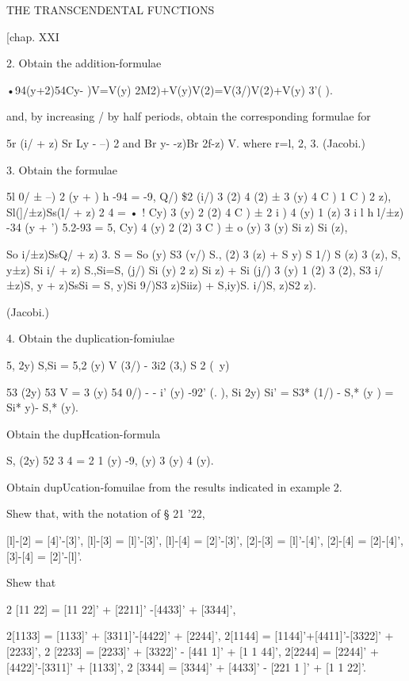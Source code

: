 THE TRANSCENDENTAL FUNCTIONS 



[chap. XXI 



2. Obtain the addition-formulae 

•94(y+2)54Cy- )V=V(y) 2M2)+V(y)V(2)=V(3/)V(2)+V(y) 3'( ). 

and, by increasing  / by half periods, obtain the corresponding formulae for 

5r (i/ + z) Sr Ly - --)  2  and Br y- -z)Br 2f-z) V. 
where r=l, 2, 3. (Jacobi.) 

3. Obtain the formulae 

5l 0/ ± --)  2 (y +  ) h -94 = -9, Q/) \$2 (i/)  3 (2)  4 (2) ±  3 (y)  4 C )  1 C )  2  z), 
Sl(]/±z)Ss(l/ + z)  2 4 = • ! Cy)  3 (y)  2 (2)  4 C ) ±  2 i )  4 (y)  1 (z)  3 i l 
h l/±z) -34 (y + ') 5.2-93 = 5, Cy)  4 (y)  2 (2)  3 C ) ±  o (y)  3 (y) Si  z) Si (z), 

So i/±z)SsQ/ + z) 3. S  = So (y) S3 (v/) S., (2)  3 (z) + S   y) S   1/) S  (z) 3  (z), 
S, y±z) Si i/ + z) S.,Si=S, (j/) Si (y)  2  z) Si  z) + Si (j/)  3 (y)  1 (2)  3 (2), 
S3 i/±z)S, y + z)SsSi = S, y)Si 9/)S3 z)Siiz) + S,iy)S. i/)S, z)S2 z). 

(Jacobi.) 

4. Obtain the duplication-fomiulae 

5,  2y) S,Si  = 5,2 (y) V (3/) - 3i2 (3,) S 2 (\ y)  

53 (2y) 53 V =  3  (y) 54  0/) - - i' (y) -92'  (. ), 
Si  2y) Si' = S3* (1/) - S,* (y ) = Si* y)- S,* (y). 



Obtain the dupHcation-formula 

S, (2y) 52 3 4 = 2 1 (y) -9, (y)  3 (y)  4 (y). 

Obtain dupUcation-fomuilae from the results indicated in example 2. 

Shew that, with the notation of § 21 '22, 

[l]-[2] = [4]'-[3]', [l]-[3] = [l]'-[3]', [l]-[4] = [2]'-[3]', 
[2]-[3] = [l]'-[4]', [2]-[4] = [2]-[4]', [3]-[4] = [2]'-[l]'. 

Shew that 

2 [11 22] = [11 22]' + [2211]' -[4433]' + [3344]', 

2[1133] = [1133]' + [3311]'-[4422]' + [2244]', 
2[1144] = [1144]'+[4411]'-[3322]' + [2233]', 
2 [2233] = [2233]' + [3322]' - [441 1]' + [1 1 44]', 
2[2244] = [2244]' + [4422]'-[3311]' + [1133]', 
2 [3344] = [3344]' + [4433]' - [221 1 ]' + [1 1 22]'. 

